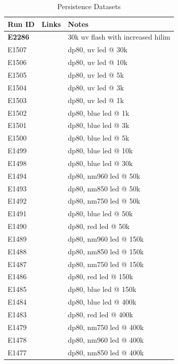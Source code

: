\begin{table}[H]
\centering
\caption{Persistence Datasets\label{table:runs_persistence}}
\begin{tabular}{|p{1.5cm}|p{2.9cm}|p{9cm}|}
\hline
Run ID & Links & Notes \\ \hline
\textbf{E2286} & & 30k uv flash with increased hilim\\ \hline
E1507 & & dp80, uv led @ 30k \\ \hline
E1506 & & dp80, uv led @ 10k\\ \hline
E1505 & & dp80, uv led @ 5k\\ \hline
E1504 & & dp80, uv led @ 3k\\ \hline
E1503 & & dp80, uv led @ 1k\\ \hline
E1502 & & dp80, blue led @ 1k\\ \hline
E1501 & & dp80, blue led @ 3k\\ \hline
E1500 & & dp80, blue led @ 5k\\ \hline
E1499 & & dp80, blue led @ 10k\\ \hline
E1498 & & dp80, blue led @ 30k\\ \hline
E1494 & & dp80, nm960 led @ 50k\\ \hline
E1493 & & dp80, nm850 led @ 50k\\ \hline
E1492 & & dp80, nm750 led @ 50k\\ \hline
E1491 & & dp80, blue led @ 50k\\ \hline
E1490 & & dp80, red led @ 50k\\ \hline
E1489 & & dp80, nm960 led @ 150k\\ \hline
E1488 & & dp80, nm850 led @ 150k\\ \hline
E1487 & & dp80, nm750 led @ 150k\\ \hline
E1486 & & dp80, red led @ 150k\\ \hline
E1485 & & dp80, blue led @ 150k\\ \hline
E1484 & & dp80, blue led @ 400k\\ \hline
E1483 & & dp80, red led @ 400k\\ \hline
E1479 & & dp80, nm750 led @ 400k\\ \hline
E1478 & & dp80, nm960 led @ 400k\\ \hline
E1477 & & dp80, nm850 led @ 400k\\ \hline
\end{tabular}
\end{table}

